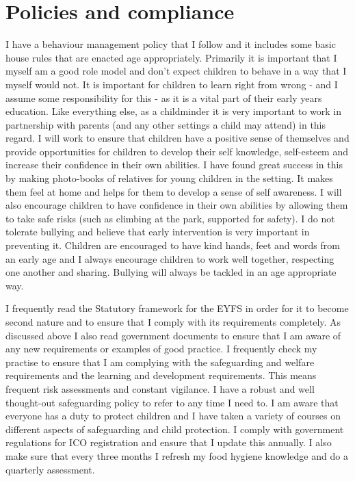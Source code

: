 \documentclass[10pt,a4paper]{report}
\begin{document}
\section{Policies and compliance}

I have a behaviour management policy that I follow and it includes some basic house rules that are enacted age appropriately. Primarily it is important that I myself am a good role model and don't expect children to behave in a way that I myself would not. It is important for children to learn right from wrong - and I assume some responsibility for this - as it is a vital part of their early years education. Like everything else, as a childminder it is very important to work in partnership with parents (and any other settings a child may attend) in this regard. I will work to ensure that children have a positive sense of themselves and provide opportunities for children to develop their self knowledge, self-esteem and increase their confidence in their own abilities. I have found great success in this by making photo-books of relatives for young children in the setting. It makes them feel at home and helps for them to develop a sense of self awareness. I will also encourage children to have confidence in their own abilities by allowing them to take safe risks (such as climbing at the park, supported for safety). I do not tolerate bullying and believe that early intervention is very important in preventing it. Children are encouraged to have kind hands, feet and words from an early age and I always encourage children to work well together, respecting one another and sharing. Bullying will always be tackled in an age appropriate way. 

I frequently read the Statutory framework for the EYFS in order for it to become second nature and to ensure that I comply with its requirements completely. As discussed above I also read government documents to ensure that I am aware of any new requirements or examples of good practice. I frequently check my practise to ensure that I am complying with the safeguarding and welfare requirements and the learning and development requirements. This means frequent risk assessments and constant vigilance. I have a robust and well thought-out safeguarding policy to refer to any time I need to. I am aware that everyone has a duty to protect children and I have taken a variety of courses on different aspects of safeguarding and child protection. I comply with government regulations for ICO registration and ensure that I update this annually. I also make sure that every three months I refresh my food hygiene knowledge and do a quarterly assessment.
\end{document}
